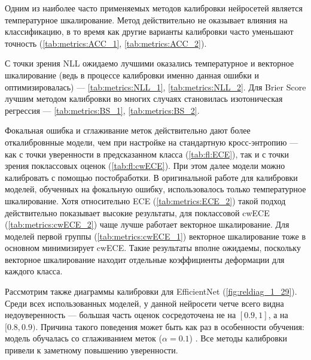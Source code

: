\documentclass[12pt]{article}
\begin{document}
Одним из наиболее часто применяемых методов калибровки нейросетей является температурное шкалирование. Метод действительно не оказывает влияния на классификацию, в то время как другие варианты калибровки часто уменьшают точность (\autoref{tab:metrics:ACC_1}, \autoref{tab:metrics:ACC_2}). 

С точки зрения NLL ожидаемо лучшими оказались температурное и векторное шкалирование (ведь в процессе калибровки именно данная ошибки и оптимизировалась) --- \autoref{tab:metrics:NLL_1}, \autoref{tab:metrics:NLL_2}. Для Brier Score лучшим методом калибровки во многих случаях становилась изотоническая регрессия --- \autoref{tab:metrics:BS_1}, \autoref{tab:metrics:BS_2}. 

\begin{table}[h!]
    \begin{minipage}[h!]{0.47\textwidth}
        
    \end{minipage}\hfill
    \begin{minipage}[h!]{0.47\textwidth}
        
    \end{minipage}
\end{table}
Фокальная ошибка и сглаживание меток действительно дают более откалибровнные модели, чем при настройке на стандартную кросс-энтропию — как с точки уверенности в предсказанном класса (\autoref{tab:fl:ECE}), так и с точки зрения поклассовых оценок (\autoref{tab:fl:cwECE}). При этом далее модели можно калибровать с помощью постобработки. В оригинальной работе \cite{focal_calib} для калибровки моделей, обученных на фокальную ошибку, использовалось только температурное шкалирование. Хотя относительно ECE (\autoref{tab:metrics:ECE_2}) такой подход действительно показывает высокие результаты, для поклассовой cwECE (\autoref{tab:metrics:cwECE_2}) чаще лучше работает векторное шкалирование. Для моделей первой группы (\autoref{tab:metrics:cwECE_1}) векторное шкалирование тоже в основном минимизирует cwECE. Такие результаты вполне ожидаемы, поскольку векторное шкалирование находит отдельные коэффициенты деформации для каждого класса.

Рассмотрим также диаграммы калибровки для EfficientNet (\autoref{fig:reldiag_1_29}). Среди всех использованных моделей, у данной нейросети четче всего видна недоуверенность --- большая часть оценок сосредоточена не на $[0.9, 1]$, а на $[0.8, 0.9)$. Причина такого поведения может быть как раз в особенности обучения: модель обучалась со сглаживанием меток ($\alpha=0.1$) \cite{pretrained_imagenet}. Все методы калибровки привели к заметному повышению уверенности.
\end{document}
